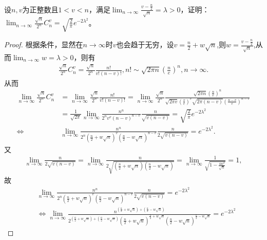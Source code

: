 \documentclass[lang=cn,newtx,10pt,scheme=chinese]{elegantbook}
\begin{document}
\begin{example}
设\(n,v\)为正整数且\(1 < v < n\)，满足\(\lim_{n\rightarrow\infty}\frac{v-\frac{n}{2}}{\sqrt{n}}=\lambda>0\)，证明：\(\lim_{n\rightarrow\infty}\frac{\sqrt{n}}{2^n}C_n^v=\sqrt{\frac{2}{\pi}}e^{-2\lambda^2}\)。
\end{example}
\begin{proof}
根据条件，显然在\(n\rightarrow\infty\)时\(v\)也会趋于无穷，设\(v = \frac{n}{2}+w\sqrt{n}\),则$w=\frac{v-\frac{n}{2}}{\sqrt{n}}$,从而\(\lim_{n\rightarrow\infty}w=\lambda>0\)，则有
\begin{align*}
\frac{\sqrt{n}}{2^n}C_n^v=\frac{\sqrt{n}}{2^n}\frac{n!}{v!(n - v)!},n!\sim\sqrt{2\pi n}\left(\frac{n}{e}\right)^n,n\to \infty.
\end{align*}
从而
\begin{align*}
\lim_{n\rightarrow \infty} \frac{\sqrt{n}}{2^n}C_{n}^{v}&=\underset{n\rightarrow \infty}{\lim}\frac{\sqrt{n}}{2^n}\frac{n!}{v!\left( n-v \right) !}=\lim_{n\rightarrow \infty} \frac{\sqrt{n}}{2^n}\frac{\sqrt{2\pi n}\left( \frac{n}{e} \right) ^n}{\sqrt{2\pi v}\left( \frac{v}{e} \right) ^v\sqrt{2\pi (n-v)}\left( \frac{n-v}{e} \right) ^{n-v}}
\\
&=\frac{1}{\sqrt{2\pi}}\lim_{n\rightarrow \infty} \frac{n^n}{2^nv^v(n-v)^{n-v}}\frac{n}{\sqrt{v(n-v)}}=\sqrt{\frac{2}{\pi}}e^{-2\lambda ^2}
\\
\Leftrightarrow &\lim_{n\rightarrow \infty} \frac{n^n}{2^n\left( \frac{n}{2}+w\sqrt{n} \right) ^v\left( \frac{n}{2}-w\sqrt{n} \right) ^{n-v}}\frac{n}{2\sqrt{v(n-v)}}=e^{-2\lambda ^2}.
\end{align*}
又
\begin{align*}
\lim_{n\rightarrow \infty} \frac{n}{2\sqrt{v(n-v)}}=\lim_{n\rightarrow \infty} \frac{n}{2\sqrt{\left( \frac{n}{2}+w\sqrt{n} \right) \left( \frac{n}{2}-w\sqrt{n} \right)}}=\lim_{n\rightarrow \infty} \frac{1}{\sqrt{1-\frac{4w^2}{\sqrt{n}}}}=1,
\end{align*}
故
\begin{align}
&\lim_{n\rightarrow \infty} \frac{n^n}{2^n\left( \frac{n}{2}+w\sqrt{n} \right) ^v\left( \frac{n}{2}-w\sqrt{n} \right) ^{n-v}}\frac{n}{2\sqrt{v(n-v)}}=e^{-2\lambda ^2}
\nonumber
\\
&\Leftrightarrow \lim_{n\rightarrow \infty} \frac{n^{\left( \frac{n}{2}+w\sqrt{n} \right) +\left( \frac{n}{2}-w\sqrt{n} \right)}}{2^{\left( \frac{n}{2}+w\sqrt{n} \right) +\left( \frac{n}{2}-w\sqrt{n} \right)}\left( \frac{n}{2}+w\sqrt{n} \right) ^{\frac{n}{2}+w\sqrt{n}}\left( \frac{n}{2}-w\sqrt{n} \right) ^{\frac{n}{2}-w\sqrt{n}}}=e^{-2\lambda ^2}

\end{align}
\end{proof}
\end{document}
